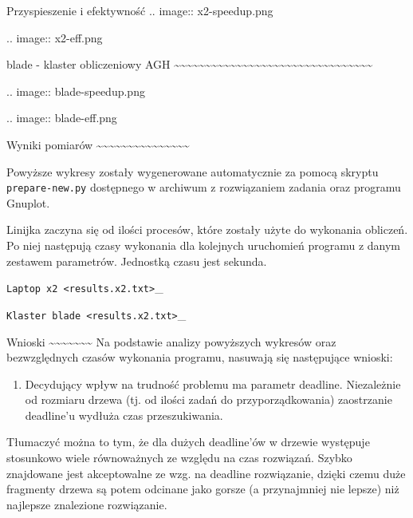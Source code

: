 \documentclass[ignorenonframetext,]{beamer}
\begin{document}
\begin{frame}[fragile]
\begin{block}{Przyspieszenie i efektywność}
.. image:: x2-speedup.png

.. image:: x2-eff.png

blade - klaster obliczeniowy AGH
\textasciitilde{}\textasciitilde{}\textasciitilde{}\textasciitilde{}\textasciitilde{}\textasciitilde{}\textasciitilde{}\textasciitilde{}\textasciitilde{}\textasciitilde{}\textasciitilde{}\textasciitilde{}\textasciitilde{}\textasciitilde{}\textasciitilde{}\textasciitilde{}\textasciitilde{}\textasciitilde{}\textasciitilde{}\textasciitilde{}\textasciitilde{}\textasciitilde{}\textasciitilde{}\textasciitilde{}\textasciitilde{}\textasciitilde{}\textasciitilde{}\textasciitilde{}\textasciitilde{}\textasciitilde{}\textasciitilde{}\textasciitilde{}

.. image:: blade-speedup.png

.. image:: blade-eff.png

Wyniki pomiarów
\textasciitilde{}\textasciitilde{}\textasciitilde{}\textasciitilde{}\textasciitilde{}\textasciitilde{}\textasciitilde{}\textasciitilde{}\textasciitilde{}\textasciitilde{}\textasciitilde{}\textasciitilde{}\textasciitilde{}\textasciitilde{}\textasciitilde{}

Powyższe wykresy zostały wygenerowane automatycznie za pomocą skryptu
\texttt{prepare-new.py} dostępnego w archiwum z rozwiązaniem zadania
oraz programu Gnuplot.

Linijka zaczyna się od ilości procesów, które zostały użyte do wykonania
obliczeń. Po niej następują czasy wykonania dla kolejnych uruchomień
programu z danym zestawem parametrów. Jednostką czasu jest sekunda.

\texttt{Laptop x2 \textless{}results.x2.txt\textgreater{}}\_

\texttt{Klaster blade \textless{}results.x2.txt\textgreater{}}\_

Wnioski
\textasciitilde{}\textasciitilde{}\textasciitilde{}\textasciitilde{}\textasciitilde{}\textasciitilde{}\textasciitilde{}
Na podstawie analizy powyższych wykresów oraz bezwzględnych czasów
wykonania programu, nasuwają się następujące wnioski:

\begin{enumerate}[1.]
\item
  Decydujący wpływ na trudność problemu ma parametr deadline.
  Niezależnie od rozmiaru drzewa (tj. od ilości zadań do
  przyporządkowania) zaostrzanie deadline'u wydłuża czas przeszukiwania.
\end{enumerate}

Tłumaczyć można to tym, że dla dużych deadline'ów w drzewie występuje
stosunkowo wiele równoważnych ze względu na czas rozwiązań. Szybko
znajdowane jest akceptowalne ze wzg. na deadline rozwiązanie, dzięki
czemu duże fragmenty drzewa są potem odcinane jako gorsze (a
przynajmniej nie lepsze) niż najlepsze znalezione rozwiązanie.


\end{block}
\end{frame}
\end{document}
